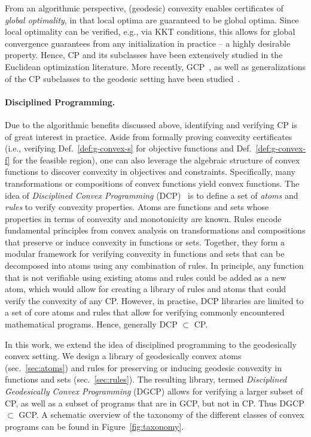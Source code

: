 \documentclass[twoside,11pt]{article}
\begin{document}
From an algorithmic perspective, (geodesic) convexity enables certificates of \emph{global optimality}, in that local optima are guaranteed to be global optima. Since local optimality can be verified, e.g., via KKT conditions, this allows for global convergence guarantees from any initialization in practice -- a highly desirable property. 
Hence, CP and its subclasses have been extensively studied in the Euclidean optimization literature. More recently, GCP~\citep{udriste1994convex,bacak2014convex,boumal2020introduction,absil_interpolation}, as well as generalizations of the CP subclasses to the geodesic setting have been studied~\citep{sra2015conic}.

\paragraph{Disciplined Programming.}
Due to the algorithmic benefits discussed above, identifying and verifying CP is of great interest in practice. Aside from formally proving convexity certificates (i.e., verifying Def.~\ref{def:g-convex-s} for objective functions and Def.~\ref{def:g-convex-f} for the feasible region), one can also leverage the algebraic structure of convex functions to discover convexity in objectives and constraints. Specifically, many transformations or compositions of convex functions yield convex functions. The idea of \emph{Disciplined Convex Programming} (DCP)~\citep{grant2006disciplined} is to define a set of \emph{atoms} and \emph{rules} to verify convexity properties. Atoms are functions and sets whose properties in terms of convexity and monotonicity are known. Rules encode fundamental principles from convex analysis on transformations and compositions that preserve or induce convexity in functions or sets. Together, they form a modular framework for verifying convexity in functions and sets that can be decomposed into atoms using any combination of rules. In principle, any function that is not verifiable using existing atoms and rules could be added as a new atom, which would allow for creating a library of rules and atoms that could verify the convexity of any CP. However, in practise, DCP libraries are limited to a set of core atoms and rules that allow for verifying commonly encountered mathematical programs. Hence, generally DCP $\subset$ CP.

In this work, we extend the idea of disciplined programming to the geodesically convex setting. We design a library of geodesically convex atoms (sec.~\ref{sec:atoms}) and rules for preserving or inducing geodesic convexity in functions and sets (sec.~\ref{sec:rules}). The resulting library, termed \emph{Disciplined Geodesically Convex Programming} (DGCP) allows for verifying a larger subset of CP, as well as a subset of programs that are in GCP, but not in CP. Thus DGCP $\subset$ GCP. A schematic overview of the taxonomy of the different classes of convex programs can be found in Figure~\ref{fig:taxonomy}.
\end{document}
